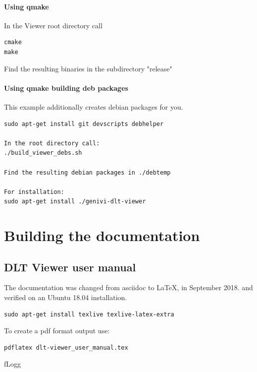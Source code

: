 \documentclass[a4paper,11pt]{article}
\begin{document}
\paragraph{Using qmake}
In the Viewer root directory call

\begin{verbatim}
cmake
make
\end{verbatim}

Find the resulting binaries in the subdirectory "release"


\paragraph{Using qmake building deb packages}

This example additionally creates debian packages for you.\linebreak
\begin{verbatim}
sudo apt-get install git devscripts debhelper

In the root directory call:
./build_viewer_debs.sh

Find the resulting debian packages in ./debtemp

For installation:
sudo apt-get install ./genivi-dlt-viewer
\end{verbatim}

\pagebreak

\section{Building the documentation}

\subsection{DLT Viewer user manual}

The documentation was changed from asciidoc to  \LaTeX, in September 2018.\linebreak
and verified on an Ubuntu 18.04 installation.

\begin{verbatim}
sudo apt-get install texlive texlive-latex-extra
\end{verbatim}

To create a pdf format output use:
\begin{verbatim}
pdflatex dlt-viewer_user_manual.tex
\end{verbatim}fLogg
\end{document}
